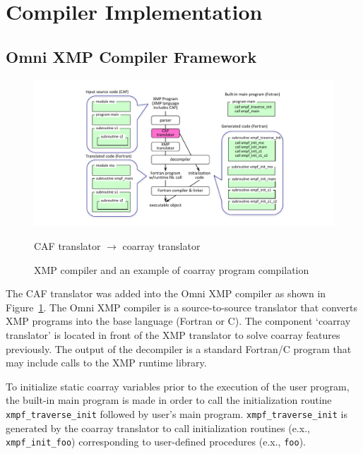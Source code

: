 \section{Compiler Implementation}\label{sec:compiler}



\subsection{Omni XMP Compiler Framework}

\begin{figure}[tbh]
 \begin{center}
  \includegraphics[trim=30mm 0mm 20mm 7mm, scale=1.0]{figs/translator-tmp.pdf}
  \caption{XMP compiler and an example of coarray program compilation}
  \label{fig:translator}
  CAF translator $\rightarrow$ coarray translator
 \end{center}
\end{figure}

The CAF translator was added into the Omni XMP compiler as shown in Figure~\ref{fig:translator}.
The Omni XMP compiler is a source-to-source translator that converts XMP programs into 
the base language (Fortran or C).  The component `coarray translator' is located in 
front of the XMP translator to solve coarray features previously. The output of the decompiler 
is a standard Fortran/C program that may include calls to the XMP runtime library.

To initialize static coarray variables prior to the execution of the user program, 
the built-in main program is made in order to call the initialization routine 
{\tt xmpf\_traverse\_init} followed by user’s main program.
{\tt xmpf\_traverse\_init} is generated by the coarray translator to call initialization 
routines (e.x., {\tt xmpf\_init\_foo}) corresponding to user-defined procedures (e.x., {\tt foo}).

